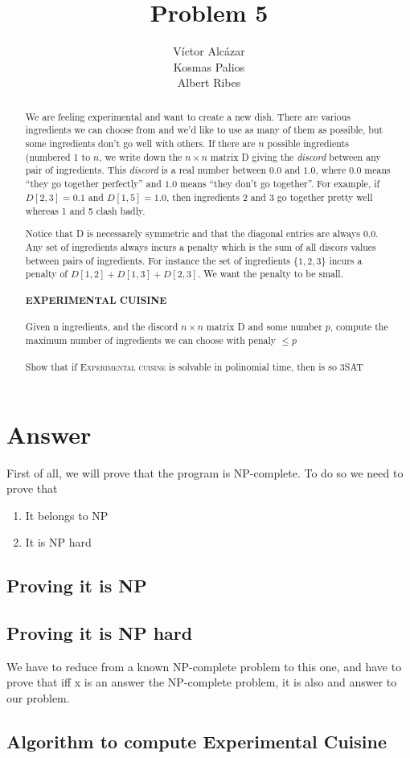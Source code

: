 \documentclass[a4paper,10pt]{article}
\title{Problem 5}
\author{
Víctor Alcázar \\
Kosmas Palios \\
Albert Ribes
}
\begin{document}
\maketitle
\begin{abstract}
We are feeling experimental and want to create a new dish. There are various ingredients we can choose from and we'd like to use as many of them as possible, but some ingredients don't go well with others. If there are $n$ possible ingredients (numbered 1 to $n$, we write down the $n\times n$ matrix D giving the \textit{discord} between any pair of ingredients. This \textit{discord} is a real number between $0.0$ and $1.0$, where $0.0$ means ``they go together perfectly'' and $1.0$ means ``they don't go together''. For example, if $D[2,3] = 0.1$ and $D[1,5] = 1.0$, then ingredients 2 and 3 go together pretty well whereas 1  and 5 clash badly.

Notice that D is necessarely symmetric and that the diagonal entries are always $0.0$. Any set of ingredients always incurs a penalty which is the sum of all discors values between pairs of ingredients. For instance the set of ingredients $\{1,2,3\}$ incurs a penalty of $D[1,2] + D[1,3] + D[2,3]$. We want the penalty to be small.

\paragraph{EXPERIMENTAL CUISINE}
Given n ingredients, and the discord $n \times n$ matrix D and some number $p$, compute the maximum number of ingredients we can choose with penaly $\leq p$
\\
\\
Show that if \textsc{Experimental cuisine} is solvable in polinomial time, then is so 3SAT
\end{abstract}


\section{Answer}
First of all, we will prove that the program is NP-complete. To do so we need to prove that
\begin{enumerate}
  \item It belongs to NP
  \item It is NP hard
\end{enumerate}

\subsection{Proving it is NP}

\subsection{Proving it is NP hard}
We have to reduce from a known NP-complete problem to this one, and have to prove that iff x is an answer the NP-complete problem, it is also and answer to our problem.

\subsection{Algorithm to compute Experimental Cuisine}
\end{document}
